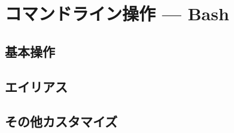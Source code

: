 \documentclass[main]{subfiles}
\begin{document}
\chapter{コマンドライン操作 --- Bash}
\section{基本操作}
\section{エイリアス}
\section{その他カスタマイズ}
\fontsize{10.2}{10} \selectfont
\end{document}
